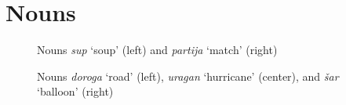 \section{Nouns}\label{app:nouns}
\begin{figure}[H]\small
\hfill%
%
\caption{Nouns \textit{sup} `soup' (left) and \textit{partija} `match' (right)}
\end{figure}

\begin{figure}[H]
\hfill%
\hfill%
%
\caption{Nouns \textit{doroga} `road' (left), \textit{uragan} `hurricane' (center), and \textit{\v{s}ar} `balloon' (right) \label{app:road}}
\end{figure}


